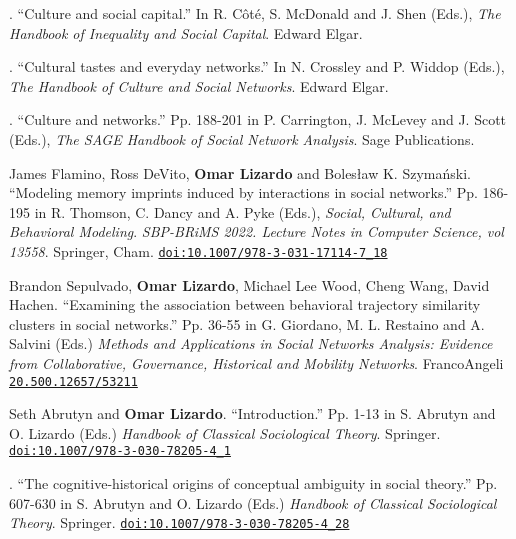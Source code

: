 
. ``Culture and social capital.'' In R. C\^{o}t\'{e}, S. McDonald and J. Shen (Eds.), {\em The Handbook of Inequality and Social Capital}. Edward Elgar.

. ``Cultural tastes and everyday networks.'' In N. Crossley and P. Widdop (Eds.), {\em The Handbook of Culture and Social Networks}. Edward Elgar.

. ``Culture and networks.'' Pp. 188-201 in P. Carrington, J. McLevey and J. Scott (Eds.), {\em The SAGE Handbook of Social Network Analysis}. Sage Publications. 

\ind James Flamino, Ross DeVito, {\bf Omar Lizardo} and Boles\l{}aw K. Szyma\'{n}ski. ``Modeling memory imprints induced by interactions in social networks.'' Pp. 186-195 in R. Thomson, C. Dancy and A. Pyke (Eds.), {\em Social, Cultural, and Behavioral Modeling}. {\em SBP-BRiMS 2022. Lecture Notes in Computer Science, vol 13558}. Springer, Cham. \href{https://doi.org/10.1007/978-3-031-17114-7_18}{\nolinkurl{doi:10.1007/978-3-031-17114-7_18}}

\ind Brandon Sepulvado, {\bf Omar Lizardo}, Michael Lee Wood, Cheng Wang, David Hachen. ``Examining the association between behavioral trajectory similarity clusters in social networks.'' Pp. 36-55 in G. Giordano, M. L. Restaino and A. Salvini (Eds.)  {\em Methods and Applications in Social Networks Analysis: Evidence from Collaborative, Governance, Historical and Mobility Networks}. FrancoAngeli \href{https://library.oapen.org/handle/20.500.12657/53211}{\nolinkurl{20.500.12657/53211}}

\ind Seth Abrutyn and {\bf Omar Lizardo}. ``Introduction.'' Pp. 1-13 in S. Abrutyn and O. Lizardo (Eds.) {\em Handbook of Classical Sociological Theory}. Springer. \href{https://doi.org/10.1007/978-3-030-78205-4_1}{\nolinkurl{doi:10.1007/978-3-030-78205-4_1}}

. ``The cognitive-historical origins of conceptual ambiguity in social theory.'' Pp. 607-630 in S. Abrutyn and O. Lizardo (Eds.) {\em Handbook of Classical Sociological Theory}. Springer. \href{https://doi.org/10.1007/978-3-030-78205-4_28}{\nolinkurl{doi:10.1007/978-3-030-78205-4_28}}
